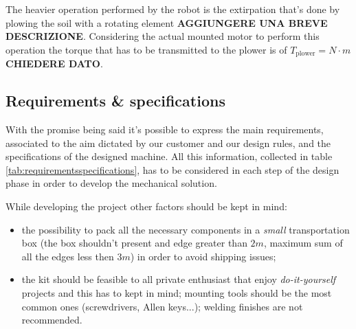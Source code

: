 	The heavier operation performed by the robot is the extirpation that's done by plowing the soil with a rotating element \textbf{AGGIUNGERE UNA BREVE DESCRIZIONE}. Considering the actual mounted motor to perform this operation the torque that has to be transmitted to the plower is of $T_\textrm{plower} = N\cdot m$ \textbf{CHIEDERE DATO}.

	
	\subsection{Requirements \& specifications}
		With the promise being said it's possible to express the main requirements, associated to the aim dictated by our customer and our design rules, and the specifications of the designed machine. All this information, collected in table \ref{tab:requirementsspecifications}, has to be considered in each step of the design phase in order to develop the mechanical solution.
		
		
		
		While developing the project other factors should be kept in mind:
		\begin{itemize}
			\item the possibility to pack all the necessary components in a \textit{small} transportation box (the box shouldn't present and edge greater than $2m$, maximum sum of all the edges less then $3m$) in order to avoid shipping issues;
			
			\item the kit should be feasible to all private enthusiast that enjoy \textit{do-it-yourself} projects and this has to kept in mind; mounting tools should be the most common ones (screwdrivers, Allen keys...); welding finishes are not recommended.
		\end{itemize}
	
	
	
	
	
	
	
	
	
	
	
	
	
	
	
	
	
	
	
	
	
	
	
	